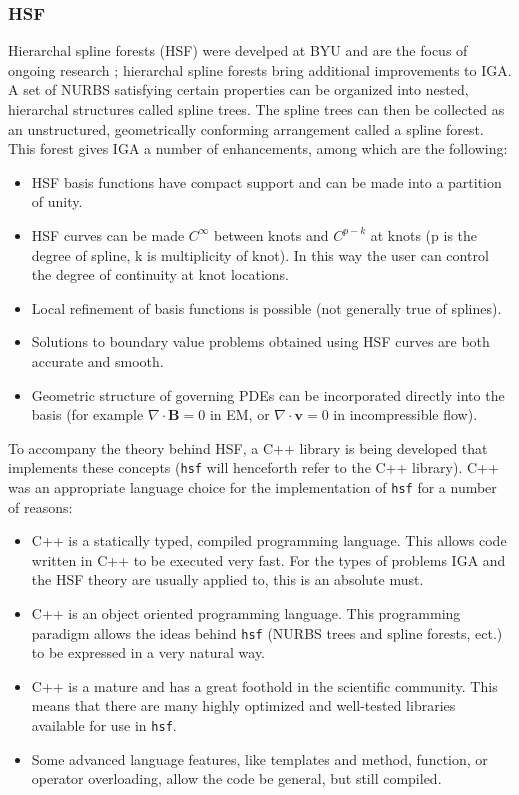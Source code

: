       \subsubsection{HSF} \label{ssub:hsfpy}

        Hierarchal spline forests (HSF) were develped at BYU and are the focus of ongoing research \cite{scott2013a}; hierarchal spline forests bring additional improvements to IGA. A set of NURBS satisfying certain properties can be organized into nested, hierarchal structures called spline trees.  The spline trees can then be collected as an unstructured, geometrically conforming arrangement called a spline forest. This forest gives IGA a number of enhancements, among which are the following:

    \begin{itemize}
      \item HSF basis functions have compact support and can be made into a partition of unity.
      \item HSF curves can be made $C^{\infty}$ between knots and $C^{p-k}$ at knots (p is the degree of spline, k is multiplicity of knot). In this way the user can control the degree of continuity at knot locations.
      \item Local refinement of basis functions is possible (not generally true of splines).
      \item Solutions to boundary value problems obtained using HSF curves are both accurate and smooth.
      \item Geometric structure of governing PDEs can be incorporated directly into the basis (for example $\nabla\cdot\mathbf{B} = 0$ in EM, or $\nabla\cdot\mathbf{v} = 0$ in incompressible flow).
    \end{itemize}
    \mainstretch{}

    To accompany the theory behind HSF, a C++ library is being developed that implements these concepts (\texttt{hsf} will henceforth refer to the C++ library). C++ was an appropriate language choice for the implementation of \texttt{hsf} for a number of reasons:

    \begin{itemize}
      \item C++ is a statically typed, compiled programming language. This allows code written in C++ to be executed very fast. For the types of problems IGA and the HSF theory are usually applied to, this is an absolute must.
      \item C++ is an object oriented programming language. This programming paradigm allows the ideas behind \texttt{hsf} (NURBS trees and spline forests, ect.) to be expressed in a very natural way.
      \item C++ is a mature and has a great foothold in the scientific community. This means that there are many highly optimized and well-tested libraries available for use in \texttt{hsf}.
      \item Some advanced language features, like templates and method, function, or operator overloading, allow the code be general, but still compiled.
    \end{itemize}
    \mainstretch{}

